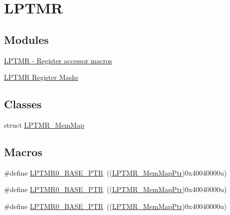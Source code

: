 \hypertarget{group___l_p_t_m_r___peripheral}{}\section{L\+P\+T\+MR}
\label{group___l_p_t_m_r___peripheral}
\subsection*{Modules}
\begin{DoxyCompactItemize}
\item 
\hyperlink{group___l_p_t_m_r___register___accessor___macros}{L\+P\+T\+M\+R -\/ Register accessor macros}
\item 
\hyperlink{group___l_p_t_m_r___register___masks}{L\+P\+T\+M\+R Register Masks}
\end{DoxyCompactItemize}
\subsection*{Classes}
\begin{DoxyCompactItemize}
\item 
struct \hyperlink{struct_l_p_t_m_r___mem_map}{L\+P\+T\+M\+R\+\_\+\+Mem\+Map}
\end{DoxyCompactItemize}
\subsection*{Macros}
\begin{DoxyCompactItemize}
\item 
\#define \hyperlink{group___l_p_t_m_r___peripheral_ga90a9194151ad11b422bcab162e797eda}{L\+P\+T\+M\+R0\+\_\+\+B\+A\+S\+E\+\_\+\+P\+TR}~((\hyperlink{group___l_p_t_m_r___peripheral_ga765226e2eeb35160c12820d4a2541320}{L\+P\+T\+M\+R\+\_\+\+Mem\+Map\+Ptr})0x40040000u)
\item 
\#define \hyperlink{group___l_p_t_m_r___peripheral_ga90a9194151ad11b422bcab162e797eda}{L\+P\+T\+M\+R0\+\_\+\+B\+A\+S\+E\+\_\+\+P\+TR}~((\hyperlink{group___l_p_t_m_r___peripheral_ga765226e2eeb35160c12820d4a2541320}{L\+P\+T\+M\+R\+\_\+\+Mem\+Map\+Ptr})0x40040000u)
\item 
\#define \hyperlink{group___l_p_t_m_r___peripheral_ga90a9194151ad11b422bcab162e797eda}{L\+P\+T\+M\+R0\+\_\+\+B\+A\+S\+E\+\_\+\+P\+TR}~((\hyperlink{group___l_p_t_m_r___peripheral_ga765226e2eeb35160c12820d4a2541320}{L\+P\+T\+M\+R\+\_\+\+Mem\+Map\+Ptr})0x40040000u)
\end{DoxyCompactItemize}
